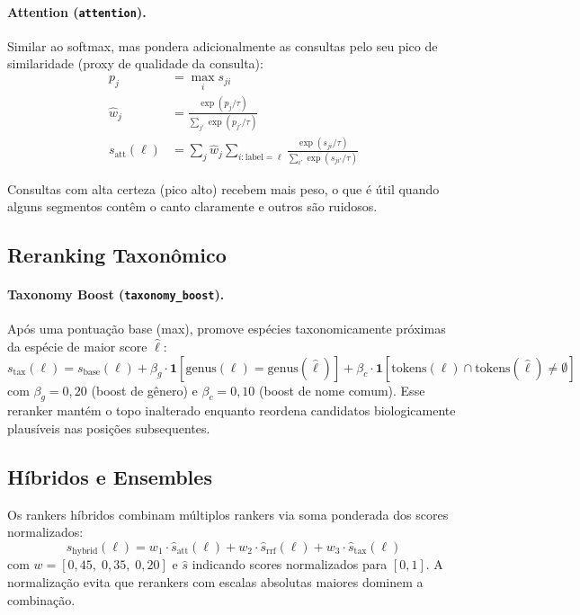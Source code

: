\documentclass[12pt,a4paper]{article}
\begin{document}
\paragraph{Attention (\texttt{attention}).}
Similar ao softmax, mas pondera adicionalmente as consultas pelo seu pico de
similaridade (proxy de qualidade da consulta):
\begin{align}
  p_j &= \max_i s_{ji} \label{eq:att_qw}\\
  \hat{w}_j &= \frac{\exp(p_j/\tau)}{\sum_{j'}\exp(p_{j'}/\tau)}
  \label{eq:att_qnorm}\\
  s_{\text{att}}(\ell) &= \sum_j \hat{w}_j
    \sum_{i:\text{label}=\ell} \frac{\exp(s_{ji}/\tau)}{\sum_{i'}\exp(s_{ji'}/\tau)}
  \label{eq:rk_att}
\end{align}

Consultas com alta certeza (pico alto) recebem mais peso, o que é útil quando
alguns segmentos contêm o canto claramente e outros são ruidosos.

\subsection{Reranking Taxonômico}

\paragraph{Taxonomy Boost (\texttt{taxonomy\_boost}).}
Após uma pontuação base (max), promove espécies taxonomicamente próximas da
espécie de maior score $\hat{\ell}$:
\begin{equation}
  s_{\text{tax}}(\ell) = s_{\text{base}}(\ell)
  + \beta_g \cdot \mathbf{1}[\text{genus}(\ell) = \text{genus}(\hat{\ell})]
  + \beta_c \cdot \mathbf{1}[\text{tokens}(\ell) \cap \text{tokens}(\hat{\ell}) \neq \emptyset]
  \label{eq:taxboost}
\end{equation}
com $\beta_g = 0{,}20$ (boost de gênero) e $\beta_c = 0{,}10$ (boost de nome
comum). Esse reranker mantém o topo inalterado enquanto reordena candidatos
biologicamente plausíveis nas posições subsequentes.

\subsection{Híbridos e Ensembles}

Os rankers híbridos combinam múltiplos rankers via soma ponderada dos scores
normalizados:
\begin{equation}
  s_{\text{hybrid}}(\ell) =
  w_1 \cdot \hat{s}_{\text{att}}(\ell) +
  w_2 \cdot \hat{s}_{\text{rrf}}(\ell) +
  w_3 \cdot \hat{s}_{\text{tax}}(\ell)
  \label{eq:hybrid}
\end{equation}
com $w = [0{,}45,\;0{,}35,\;0{,}20]$ e $\hat{s}$ indicando scores normalizados
para $[0,1]$. A normalização evita que rerankers com escalas absolutas maiores
dominem a combinação.
\end{document}
